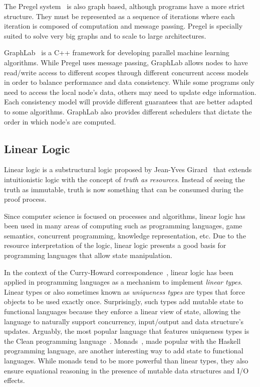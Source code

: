 The Pregel system~\cite{Malewicz:2010:PSL:1807167.1807184} is also graph based, although programs have a more strict
structure. They must be represented as a sequence of iterations where each iteration is composed of computation and message passing.
Pregel is specially suited to solve very big graphs
and to scale to large architectures.

GraphLab~\cite{GraphLab2010} is a C++ framework for developing parallel machine learning
algorithms. While Pregel uses message passing, GraphLab allows nodes to have read/write
access to different scopes through different concurrent access models in order to balance
performance and data consistency. While some programs only need to access the local node's
data, others may need to update edge information. Each consistency model will provide different
guarantees that are better adapted to some algorithms. GraphLab also provides different
schedulers that dictate the order in which node's are computed.

\subsection{Linear Logic}

Linear logic is a substructural logic proposed by Jean-Yves Girard~\cite{Girard95logic:its} that extends intuitionistic logic with the concept of \emph{truth as resources}. Instead of seeing the truth as immutable, truth is now something that can be consumed during the proof process.

Since computer science is focused on processes and algorithms, linear logic has been used
in many areas of computing such as programming languages, game semantics, concurrent programming, knowledge representation, etc.
Due to the resource interpretation of the logic, linear logic presents a good basis for programming
languages that allow state manipulation.

In the context of the Curry-Howard correspondence~\cite{howard:tfatnoc}, linear logic has been applied in programming languages
as a mechanism to implement \emph{linear types}. Linear types or also sometimes known as \emph{uniqueness types} are types
that force objects to be used exactly once. Surprisingly, such types add mutable state to functional languages because they enforce
a linear view of state, allowing the language to naturally support concurrency, input/output and data structure's updates.
Arguably, the most popular language that features uniqueness types is the Clean programming language~\cite{JFP:1349748}.
Monads~\cite{Wadler:1997:DI:262009.262011}, made popular with the Haskell programming language, are another interesting way to add state
to functional languages. While monads tend to be more powerful than linear types, they also ensure equational reasoning in the presence
of mutable data structures and I/O effects.

